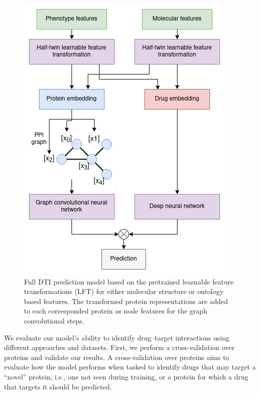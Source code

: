 \documentclass{bioinfo}
\begin{document}
\begin{figure}[!tpb]
	\centering
	\includegraphics[width=0.8\columnwidth]{figures/model_workflow.png}
	\caption{Full DTI prediction model based on the pretrained
          learnable feature transformations (LFT) for either molecular
          structure or ontology based features. The transformed
          protein representations are added to each corresponded
          protein as node features for the graph convolutional
          steps.}
	\label{fig:ModelWorkflow}
\end{figure}


We evaluate our model's ability to identify drug--target interactions
using different approaches and datasets. First, we perform a
cross-validation over proteins and validate our results. A
cross-validation over proteins aims to evaluate how the model performs
when tasked to identify drugs that may target a ``novel'' protein,
i.e., one not seen during training, or a protein for which a drug that
targets it should be predicted. 
\end{document}
